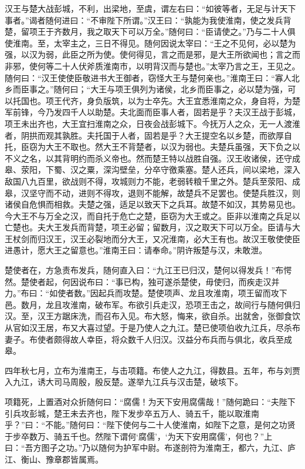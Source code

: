 \documentclass[12pt,UTF8]{ctexbook}
\begin{document}
汉王与楚大战彭城，不利，出梁地，至虞，谓左右曰：“如彼等者，无足与计天下事者。”谒者随何进曰：“不审陛下所谓。”汉王曰：“孰能为我使淮南，使之发兵背楚，留项王于齐数月，我之取天下可以万全。”随何曰：“臣请使之。”乃与二十人俱使淮南。至，太宰主之，三日不得见。随何因说太宰曰：“王之不见何，必以楚为强，以汉为弱，此臣之所为使。使何得见，言之而是邪，是大王所欲闻也；言之而非邪，使何等二十人伏斧质淮南市，以明背汉而与楚也。”太宰乃言之王，王见之。随何曰：“汉王使使臣敬进书大王御者，窃怪大王与楚何亲也。”淮南王曰：“寡人北乡而臣事之。”随何曰；“大王与项王俱列为诸侯，北乡而臣事之，必以楚为强，可以托国也。项王代齐，身负版筑，以为士卒先。大王宜悉淮南之众，身自将，为楚军前锋，今乃发四千人以助楚。夫北面而臣事人者，固若是乎？夫汉王战于彭城，项王未出齐也，大王宜扫淮南之众，日夜会战彭城下。今抚万人之众，无一人渡淮者，阴拱而观其孰胜。夫托国于人者，固若是乎？大王提空名以乡楚，而欲厚自托，臣窃为大王不取也。然大王不背楚者，以汉为弱也。夫楚兵虽强，天下负之以不义之名，以其背明约而杀义帝也。然而楚王特以战胜自强。汉王收诸侯，还守成皋、荥阳，下蜀、汉之粟，深沟壁垒，分卒守徼乘塞。楚人还兵，间以梁地，深入敌国八九百里，欲战则不得，攻城则力不能，老弱转粮千里之外。楚兵至荥阳、成皋，汉坚守而不动，进则不得攻，退则不能解，故楚兵不足罢也。使楚兵胜汉，则诸侯自危惧而相救。夫楚之强，适足以致天下之兵耳。故楚不如汉，其势易见也。今大王不与万全之汉，而自托于危亡之楚，臣窃为大王或之。臣非以淮南之兵足以亡楚也。夫大王发兵而背楚，项王必留；留数月，汉之取天下可以万全。臣请与大王杖剑而归汉王，汉王必裂地而分大王，又况淮南，必大王有也。故汉王敬使使臣进愚计，愿大王之留意也。”淮南王曰：请奉命。”阴许叛楚与汉，未敢泄。



楚使者在，方急责布发兵，随何直入曰：“九江王已归汉，楚何以得发兵！”布愕然。楚使者起，何因说布曰：“事已构，独可遂杀楚使，毋使归，而疾走汉并力。”布曰：“如使者数。”因起兵而攻楚。楚使项声、龙且攻淮南，项王留而攻下邑。数月，龙且攻淮南，破布军。布欲引兵走汉，恐项王击之，故间行与随何俱归汉。至，汉王方踞床洗，而召布入见。布大怒，悔来，欲自杀。出就舍，张御食饮从官如汉王居，布又大喜过望。于是乃使人之九江。楚已使项伯收九江兵，尽杀布妻子。布使者颇得故人幸臣，将众数千人归汉。汉益分布兵而与俱北，收兵至成皋。



四年秋七月，立布为淮南王，与击项籍。布使人之九江，得数县。五年，布与刘贾入九江，诱大司马周殷，殷反楚。遂举九江兵与汉击楚，破垓下。



项籍死，上置酒对众折随何曰：“腐儒！为天下安用腐儒哉！”随何跪曰：“夫陛下引兵攻彭城，楚王未去齐也，陛下发步卒五万人、骑五千，能以取淮南乎？”曰：“不能。”随何曰：“陛下使何与二十人使淮南，如陛下之意，是何之功贤于步卒数万、骑五千也。然陛下谓何‘腐儒’，‘为天下安用腐儒’，何也？”上曰：“吾方图子之功。”乃以随何为护军中尉。布遂剖符为淮南王，都六，九江、庐江、衡山、豫章郡皆属焉。
\end{document}
